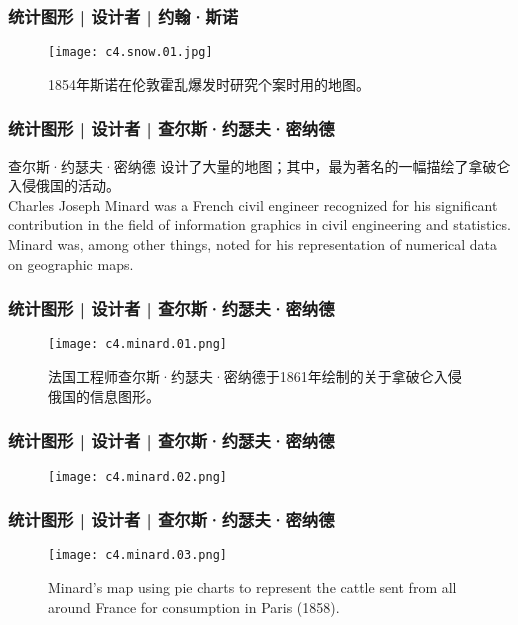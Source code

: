 \begin{frame}
  \frametitle{统计图形 | 设计者 | 约翰·斯诺}
  \begin{figure}
    \centering
    \texttt{[image: c4.snow.01.jpg]}
    \caption{1854年斯诺在伦敦霍乱爆发时研究个案时用的地图。}
  \end{figure}
\end{frame}

\begin{frame}
  \frametitle{统计图形 | 设计者 | 查尔斯·约瑟夫·密纳德}
  \begin{block}{查尔斯·约瑟夫·密纳德}
  设计了大量的地图；其中，最为著名的一幅描绘了拿破仑入侵俄国的活动。\\
  \vspace{0.5em}
  Charles Joseph Minard was a French civil engineer recognized for his significant contribution in the field of information graphics in civil engineering and statistics. Minard was, among other things, noted for his representation of numerical data on geographic maps.
  \end{block}
\end{frame}

\begin{frame}
  \frametitle{统计图形 | 设计者 | 查尔斯·约瑟夫·密纳德}
  \begin{figure}
    \centering
    \texttt{[image: c4.minard.01.png]}
    \caption{法国工程师查尔斯·约瑟夫·密纳德于1861年绘制的关于拿破仑入侵俄国的信息图形。}
  \end{figure}
\end{frame}

\begin{frame}
  \frametitle{统计图形 | 设计者 | 查尔斯·约瑟夫·密纳德}
  \begin{figure}
    \centering
    \texttt{[image: c4.minard.02.png]}
  \end{figure}
\end{frame}

\begin{frame}
  \frametitle{统计图形 | 设计者 | 查尔斯·约瑟夫·密纳德}
  \begin{figure}
    \centering
    \texttt{[image: c4.minard.03.png]}
    \caption{Minard's map using pie charts to represent the cattle sent from all around France for consumption in Paris (1858).}
  \end{figure}
\end{frame}

